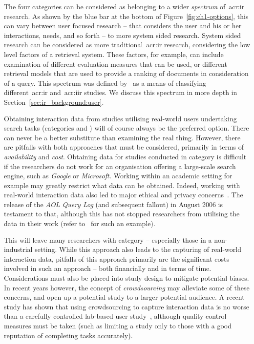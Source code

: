The four categories can be considered as belonging to a wider \emph{spectrum} of~\gls{acr:ir} research. As shown by the blue bar at the bottom of Figure~\ref{fig:ch1-options}, this can vary between user focused research -- that considers the user and his or her interactions, needs, and so forth -- to more system sided research. System sided research can be considered as more traditional~\gls{acr:ir} research, considering the low level factors of a retrieval system. These factors, for example, can include examination of different evaluation measures that can be used, or different retrieval models that are used to provide a ranking of documents in consideration of a query. This spectrum was defined by~\cite{kelly2009iir} as a means of classifying different~\gls{acr:ir} and~\gls{acr:iir} studies. We discuss this spectrum in more depth in Section~\ref{sec:ir_background:user}.

Obtaining interaction data from studies utilising real-world users undertaking search tasks (categories  and ) will of course always be the preferred option. There can never be a better substitute than examining the real thing. However, there are pitfalls with both approaches that must be considered, primarily in terms of \emph{availability} and \emph{cost}. Obtaining data for studies conducted in category  is difficult if the researchers do not work for an organisation offering a large-scale search engine, such as \emph{Google} or \emph{Microsoft.} Working within an academic setting for example may greatly restrict what data can be obtained. Indeed, working with real-world interaction data also led to major ethical and privacy concerns~\citep{korolova2009aol_query_log_privacy}. The release of the \emph{AOL Query Log} (and subsequent fallout) in August 2006 is testament to that, although this has not stopped researchers from utilising the data in their work (refer to~\cite{brenes2009aol_query_log} for such an example).

This will leave many researchers with category  -- especially those in a non-industrial setting. While this approach also leads to the capturing of real-world interaction data, pitfalls of this approach primarily are the significant costs involved in such an approach -- both financially and in terms of time. Considerations must also be placed into study design to mitigate potential biases. In recent years however, the concept of \emph{crowdsourcing} may alleviate some of these concerns, and open up a potential study to a larger potential audience. A recent study has shown that using crowdsourcing to capture interaction data is no worse than a carefully controlled lab-based user study~\citep{zuccon2013crowdsourcing_comparisons}, although quality control measures must be taken (such as limiting a study only to those with a good reputation of completing tasks accurately).

